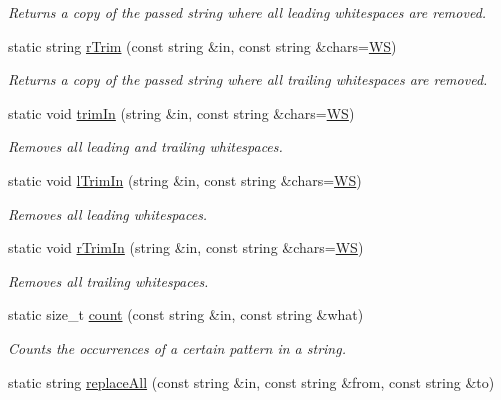 \begin{DoxyCompactItemize}
\begin{DoxyCompactList}\small\item\em Returns a copy of the passed string where all leading whitespaces are removed. \end{DoxyCompactList}\item 
static string \hyperlink{classStringUtils_a3c695e5581188932e8e491178100f6e9}{r\-Trim} (const string \&in, const string \&chars=\hyperlink{classStringUtils_a2abc03ce0e461cb7efca2166a12fd496}{W\-S})
\begin{DoxyCompactList}\small\item\em Returns a copy of the passed string where all trailing whitespaces are removed. \end{DoxyCompactList}\item 
static void \hyperlink{classStringUtils_a04fe6c34d3425e8726712163ebb99fbf}{trim\-In} (string \&in, const string \&chars=\hyperlink{classStringUtils_a2abc03ce0e461cb7efca2166a12fd496}{W\-S})
\begin{DoxyCompactList}\small\item\em Removes all leading and trailing whitespaces. \end{DoxyCompactList}\item 
static void \hyperlink{classStringUtils_a50f65fbe8e513170b4d9f19d9ca7a760}{l\-Trim\-In} (string \&in, const string \&chars=\hyperlink{classStringUtils_a2abc03ce0e461cb7efca2166a12fd496}{W\-S})
\begin{DoxyCompactList}\small\item\em Removes all leading whitespaces. \end{DoxyCompactList}\item 
static void \hyperlink{classStringUtils_a5996e64ebc6d91ecf0fdaaf12bcbb51c}{r\-Trim\-In} (string \&in, const string \&chars=\hyperlink{classStringUtils_a2abc03ce0e461cb7efca2166a12fd496}{W\-S})
\begin{DoxyCompactList}\small\item\em Removes all trailing whitespaces. \end{DoxyCompactList}\item 
static size\-\_\-t \hyperlink{classStringUtils_af14cd8f802ac50d860961e17f0b5a690}{count} (const string \&in, const string \&what)
\begin{DoxyCompactList}\small\item\em Counts the occurrences of a certain pattern in a string. \end{DoxyCompactList}\item 
static string \hyperlink{classStringUtils_ad679eae97101f4683e992b54aa28ffb0}{replace\-All} (const string \&in, const string \&from, const string \&to)

\end{DoxyCompactItemize}
